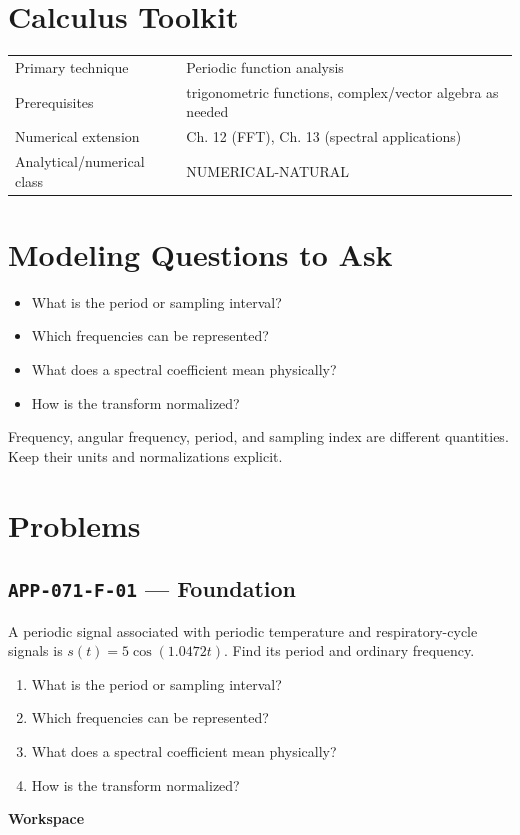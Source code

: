 \documentclass[11pt]{book}
\newcommand{\pid}[1]{\texttt{#1}}
\newcommand{\workspace}{\par\vspace{0.7in}\hrulefill\par\vspace{0.55in}\hrulefill\par}
\begin{document}
\section*{Calculus Toolkit}
\begin{tabularx}{\textwidth}{@{}lX@{}}\toprule
Primary technique & Periodic function analysis \\
Prerequisites & trigonometric functions, complex/vector algebra as needed \\
Numerical extension & Ch. 12 (FFT), Ch. 13 (spectral applications) \\
Analytical/numerical class & NUMERICAL-NATURAL \\
\bottomrule\end{tabularx}
\section*{Modeling Questions to Ask}\begin{itemize}
\item What is the period or sampling interval?
\item Which frequencies can be represented?
\item What does a spectral coefficient mean physically?
\item How is the transform normalized?
\end{itemize}
\begin{errorbox}Frequency, angular frequency, period, and sampling index are different quantities. Keep their units and normalizations explicit.\end{errorbox}
\section*{Problems}
\subsection*{\pid{APP-071-F-01} — Foundation}
\begin{problembox}
A periodic signal associated with periodic temperature and respiratory-cycle signals is $s(t)=5\cos(1.0472t)$. Find its period and ordinary frequency.
\end{problembox}
\begin{promptbox}\begin{enumerate}
\item What is the period or sampling interval?
\item Which frequencies can be represented?
\item What does a spectral coefficient mean physically?
\item How is the transform normalized?
\end{enumerate}\end{promptbox}
\textbf{Workspace}\workspace
{}
\end{document}
